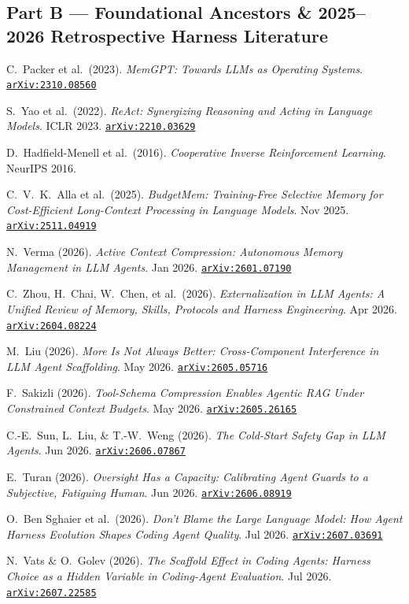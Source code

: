 \documentclass[10pt,letterpaper]{article}
\newcommand{\code}[1]{\texttt{\color{InkNavy}#1}}
\newcommand{\arxiv}[1]{\href{https://arxiv.org/abs/#1}{\code{arXiv:#1}}}
\begin{document}
\subsection*{Part B --- Foundational Ancestors \& 2025--2026 Retrospective Harness Literature}
\footnotesize
\begin{enumerate}[label={[\arabic*]}, leftmargin=2.2em, itemsep=1.1pt, start=17]
\raggedright
  \item C.\ Packer et al.\ (2023). \emph{MemGPT: Towards LLMs as Operating Systems}. \arxiv{2310.08560}
  \item S.\ Yao et al.\ (2022). \emph{ReAct: Synergizing Reasoning and Acting in Language Models}. ICLR 2023. \arxiv{2210.03629}
  \item D.\ Hadfield-Menell et al.\ (2016). \emph{Cooperative Inverse Reinforcement Learning}. NeurIPS 2016.
  \item C.\ V.\ K.\ Alla et al.\ (2025). \emph{BudgetMem: Training-Free Selective Memory for Cost-Efficient Long-Context Processing in Language Models}. Nov 2025. \arxiv{2511.04919}
  \item N.\ Verma (2026). \emph{Active Context Compression: Autonomous Memory Management in LLM Agents}. Jan 2026. \arxiv{2601.07190}
  \item C.\ Zhou, H.\ Chai, W.\ Chen, et al.\ (2026). \emph{Externalization in LLM Agents: A Unified Review of Memory, Skills, Protocols and Harness Engineering}. Apr 2026. \arxiv{2604.08224}
  \item M.\ Liu (2026). \emph{More Is Not Always Better: Cross-Component Interference in LLM Agent Scaffolding}. May 2026. \arxiv{2605.05716}
  \item F.\ Sakizli (2026). \emph{Tool-Schema Compression Enables Agentic RAG Under Constrained Context Budgets}. May 2026. \arxiv{2605.26165}
  \item C.-E.\ Sun, L.\ Liu, \& T.-W.\ Weng (2026). \emph{The Cold-Start Safety Gap in LLM Agents}. Jun 2026. \arxiv{2606.07867}
  \item E.\ Turan (2026). \emph{Oversight Has a Capacity: Calibrating Agent Guards to a Subjective, Fatiguing Human}. Jun 2026. \arxiv{2606.08919}
  \item O.\ Ben Sghaier et al.\ (2026). \emph{Don't Blame the Large Language Model: How Agent Harness Evolution Shapes Coding Agent Quality}. Jul 2026. \arxiv{2607.03691}
  \item N.\ Vats \& O.\ Golev (2026). \emph{The Scaffold Effect in Coding Agents: Harness Choice as a Hidden Variable in Coding-Agent Evaluation}. Jul 2026. \arxiv{2607.22585}

\end{enumerate}
\end{document}
